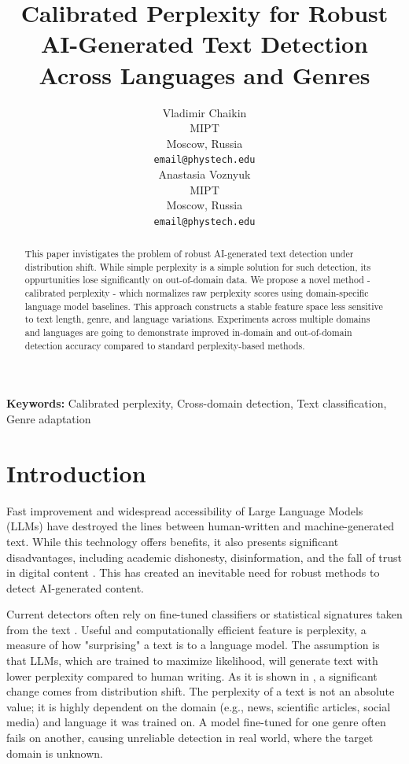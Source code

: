 \documentclass{article}
\title{Calibrated Perplexity for Robust AI-Generated Text Detection Across Languages and Genres}
\author{
  Vladimir Chaikin\\
  MIPT\\
  Moscow, Russia\\
  \texttt{email@phystech.edu}\\
  \And
  Anastasia Voznyuk\\
  MIPT\\
  Moscow, Russia\\
  \texttt{email@phystech.edu}\\
}
\begin{document}
\maketitle

\begin{abstract}
    This paper invistigates the problem of robust AI-generated text detection under distribution shift. While simple perplexity is a simple solution for such detection, its oppurtunities lose significantly on out-of-domain data. We propose a novel method - calibrated perplexity - which normalizes raw perplexity scores using domain-specific language model baselines. This approach constructs a stable feature space less sensitive to text length, genre, and language variations. Experiments across multiple domains and languages are going to demonstrate improved in-domain and out-of-domain detection accuracy compared to standard perplexity-based methods.
\end{abstract}

\textbf{Keywords:} Calibrated perplexity,
Cross-domain detection,
Text classification,
Genre adaptation

\section{Introduction}\label{sec:intro}

Fast improvement and widespread accessibility of Large Language Models (LLMs) have destroyed the lines between human-written and machine-generated text. While this technology offers benefits, it also presents significant disadvantages, including academic dishonesty, disinformation, and the fall of trust in digital content \cite{xu2024detecting, hans2024spotting}. This has created an inevitable need for robust methods to detect AI-generated content.

Current detectors often rely on fine-tuned classifiers or statistical signatures taken from the text \cite{gehrmann2019gltr}. Useful and computationally efficient feature is perplexity, a measure of how "surprising" a text is to a language model. The assumption is that LLMs, which are trained to maximize likelihood, will generate text with lower perplexity compared to human writing. As it is shown in \cite{bakhteev2022automatic}, a significant change comes from distribution shift. The perplexity of a text is not an absolute value; it is highly dependent on the domain (e.g., news, scientific articles, social media) and language it was trained on. A model fine-tuned for one genre often fails on another, causing unreliable detection in real world, where the target domain is unknown.
\end{document}
